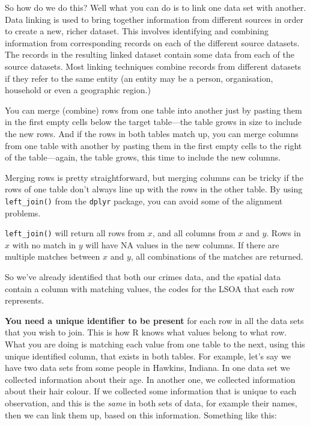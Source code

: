 \documentclass[
]{book}
\begin{document}
So how do we do this? Well what you can do is to link one data set with another. Data linking is used to bring together information from different sources in order to create a new, richer dataset. This involves identifying and combining information from corresponding records on each of the different source datasets. The records in the resulting linked dataset contain some data from each of the source datasets. Most linking techniques combine records from different datasets if they refer to the same entity (an entity may be a person, organisation, household or even a geographic region.)

You can merge (combine) rows from one table into another just by pasting them in the first empty cells below the target table---the table grows in size to include the new rows. And if the rows in both tables match up, you can merge columns from one table with another by pasting them in the first empty cells to the right of the table---again, the table grows, this time to include the new columns.

Merging rows is pretty straightforward, but merging columns can be tricky if the rows of one table don't always line up with the rows in the other table. By using \texttt{left\_join()} from the \texttt{dplyr} package, you can avoid some of the alignment problems.

\texttt{left\_join()} will return all rows from \(x\), and all columns from \(x\) and \(y\). Rows in \(x\) with no match in \(y\) will have NA values in the new columns. If there are multiple matches between \(x\) and \(y\), all combinations of the matches are returned.

So we've already identified that both our crimes data, and the spatial data contain a column with matching values, the codes for the LSOA that each row represents.

\textbf{You need a unique identifier to be present} for each row in all the data sets that you wish to join. This is how R knows what values belong to what row. What you are doing is matching each value from one table to the next, using this unique identified column, that exists in both tables. For example, let's say we have two data sets from some people in Hawkins, Indiana. In one data set we collected information about their age. In another one, we collected information about their hair colour. If we collected some information that is unique to each observation, and this is the \emph{same} in both sets of data, for example their names, then we can link them up, based on this information. Something like this:
\end{document}
